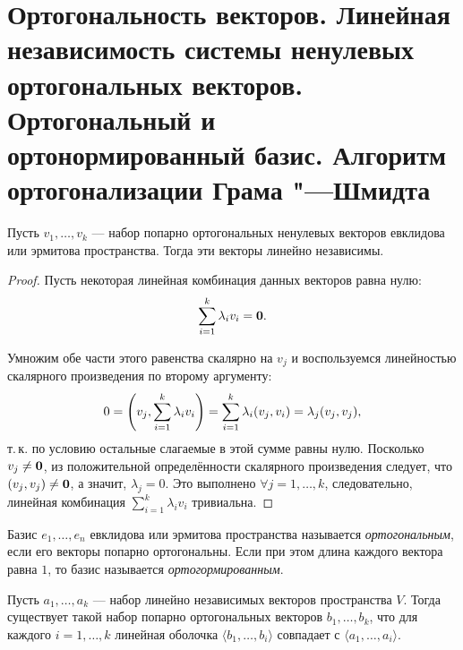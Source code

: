 \section{Ортогональность векторов. Линейная независимость системы ненулевых ортогональных векторов. Ортогональный и ортонормированный базис. Алгоритм ортогонализации Грама "---Шмидта}

\begin{proposal}
    Пусть $v_1, \ldots, v_k$ --- набор попарно ортогональных ненулевых векторов евклидова или эрмитова пространства. Тогда эти векторы линейно независимы.
\end{proposal}

\begin{proof}
    Пусть некоторая линейная комбинация данных векторов равна нулю:
    \[
        \sum_{i = 1}^k\lambda_iv_i = \boldsymbol{0}.
    \]

    Умножим обе части этого равенства скалярно на $v_j$ и воспользуемся линейностью скалярного произведения по второму аргументу:
    \[
        0 = \left(v_j, \sum_{i = 1}^k\lambda_iv_i\right) = \sum_{i = 1}^k\lambda_i(v_j, v_i) = \lambda_j(v_j, v_j),
    \]
    т.\,к. по условию остальные слагаемые в этой сумме равны нулю. Посколько $v_j \ne \boldsymbol{0}$, из положительной определённости скалярного произведения следует, что $(v_j, v_j) \ne \boldsymbol{0}$, а значит, $\lambda_j = 0$. Это выполнено $\forall j = 1, \ldots, k$, следовательно, линейная комбинация $\sum\limits_{i = 1}^k\lambda_iv_i$ тривиальна.
\end{proof}

\begin{definition}
    Базис $e_1, \ldots, e_n$ евклидова или эрмитова пространства называется \textit{ортогональным}, если его векторы попарно ортогональны. Если при этом длина каждого вектора равна $1$, то базис называется \textit{ортогормированным}.
\end{definition}

\begin{theorem}
    Пусть $a_1, \ldots, a_k$ --- набор линейно независимых векторов пространства $V$. Тогда существует такой набор попарно ортогональных векторов $b_1, \ldots, b_k$, что для каждого $i = 1, \ldots, k$ линейная оболочка $\langle b_1, \ldots, b_i\rangle$ совпадает с $\langle a_1, \ldots, a_i\rangle$.
\end{theorem}

